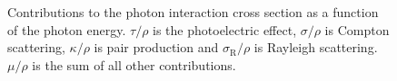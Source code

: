 \begin{figure}[!ht]
    \begin{center}
    \end{center}
        \caption[Contributions to the photon interaction cross section]
        {\small Contributions to the photon interaction cross section as a function of the photon energy.  $\tau/\rho$ is the photoelectric effect, $\sigma/\rho$ is Compton scattering, $\kappa/\rho $ is pair production and $\sigma_{\mathrm{R}}/\rho$ is Rayleigh scattering.  $\mu/\rho$ is the sum of all other contributions. \cite{:/content/aip/journal/jpcrd/9/4/10.1063/1.555629} 
}
            \label{Photon}
\end{figure}


